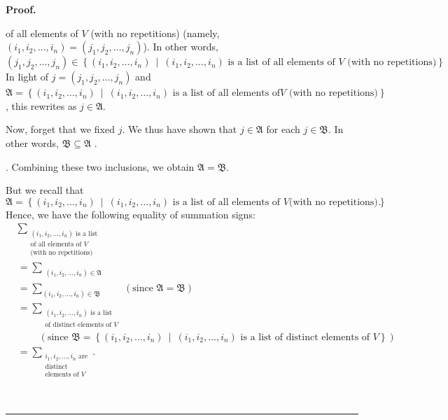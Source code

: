 \documentclass[numbers=enddot,12pt,final,onecolumn,notitlepage]{scrartcl}%
\theoremstyle{definition}
\newenvironment{proof}[1][Proof]{\noindent\textbf{#1.} }{\ \rule{0.5em}{0.5em}}
\let\sumnonlimits\sum
\renewcommand{\sum}{\sumnonlimits\limits}
\newenvironment{verlong}{}{}
\begin{document}
\begin{verlong}
\begin{proof}
{of all elements of $V$ (with no repetitions) (namely, $\left(  i_{1}%
,i_{2},\ldots,i_{n}\right)  =\left(  j_{1},j_{2},\ldots,j_{n}\right)  $). In
other words,%
\[
\left(  j_{1},j_{2},\ldots,j_{n}\right)  \in\left\{  \left(  i_{1}%
,i_{2},\ldots,i_{n}\right)  \ \mid\ \left(  i_{1},i_{2},\ldots,i_{n}\right)
\text{ is a list of all elements of }V\text{ (with no repetitions)}\right\}
.
\]
In light of $j=\left(  j_{1},j_{2},\ldots,j_{n}\right)  $ and \newline%
$\mathfrak{A}=\left\{  \left(  i_{1},i_{2},\ldots,i_{n}\right)  \ \mid
\ \left(  i_{1},i_{2},\ldots,i_{n}\right)  \text{ is a list of all elements of
}V\text{ (with no repetitions)}\right\}  $, this rewrites as $j\in
\mathfrak{A}$.
\par
Now, forget that we fixed $j$. We thus have shown that $j\in\mathfrak{A}$ for
each $j\in\mathfrak{B}$. In other words, $\mathfrak{B}\subseteq\mathfrak{A}$%
.}. Combining these two inclusions, we obtain $\mathfrak{A}=\mathfrak{B}$.

But we recall that%
\[
\mathfrak{A}=\left\{  \left(  i_{1},i_{2},\ldots,i_{n}\right)  \ \mid\ \left(
i_{1},i_{2},\ldots,i_{n}\right)  \text{ is a list of all elements of }V\text{
(with no repetitions)}\right\}  .
\]
Hence, we have the following equality of summation signs:%
\begin{align}
&  \sum_{\substack{\left(  i_{1},i_{2},\ldots,i_{n}\right)  \text{ is a
list}\\\text{of all elements of }V\\\text{(with no repetitions)}}}\nonumber\\
&  =\sum_{\substack{\left(  i_{1},i_{2},\ldots,i_{n}\right)  \in\mathfrak{A}%
}}\nonumber\\
&  =\sum_{\left(  i_{1},i_{2},\ldots,i_{n}\right)  \in\mathfrak{B}%
}\ \ \ \ \ \ \ \ \ \ \left(  \text{since }\mathfrak{A}=\mathfrak{B}\right)
\nonumber\\
&  =\sum_{\substack{\left(  i_{1},i_{2},\ldots,i_{n}\right)  \text{ is a
list}\\\text{of distinct elements of }V}}\nonumber\\
&  \ \ \ \ \ \ \ \ \ \ \left(  \text{since }\mathfrak{B}=\left\{  \left(
i_{1},i_{2},\ldots,i_{n}\right)  \ \mid\ \left(  i_{1},i_{2},\ldots
,i_{n}\right)  \text{ is a list of distinct elements of }V\right\}  \right)
\nonumber\\
&  =\sum_{\substack{i_{1},i_{2},\ldots,i_{n}\text{ are}\\\text{distinct}%
\\\text{elements of }V}}. \label{pf.cor.polar1.sumeq2}%
\end{align}



\end{proof}
\end{verlong}
\end{document}
